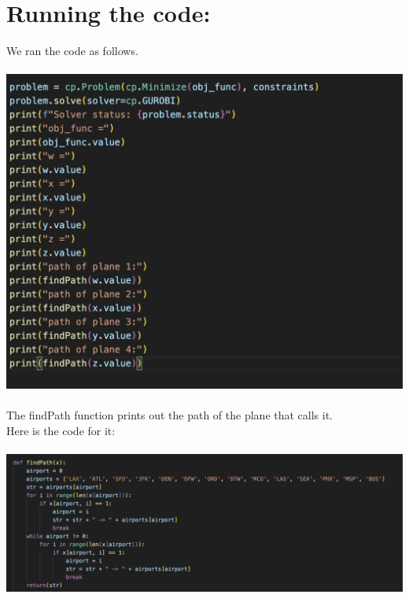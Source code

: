 \documentclass[12pt]{extarticle}
\begin{document}
\section*{\small Running the code:}
We ran the code as follows. \\ \\
\includegraphics[scale = .5]{images/runningCode.png} \\ \\
The findPath function prints out the path of the plane that calls it. \\
Here is the code for it: \\ \\
\includegraphics[scale = 0.5]{images/findPath.png} \\
\end{document}
